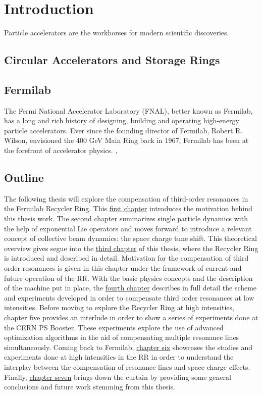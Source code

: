 \chapter{Introduction}
\label{sec:ch1}
 
Particle accelerators are the workhorses for modern scientific discoveries. 

\section{Circular Accelerators and Storage Rings}

\section{Fermilab}

The Fermi National Accelerator Laboratory (FNAL), better known as Fermilab, has a long and rich history of designing, building and operating high-energy particle accelerators. Ever since the founding director of Fermilab, Robert R. Wilson, envisioned the 400 GeV Main Ring back in 1967, Fermilab has been at the forefront of accelerator physics.     \cite{tevatron},\cite{fermilab1}

\section{Outline}

The following thesis will explore the compensation of third-order resonances in the Fermilab Recycler Ring. This \hyperref[sec:ch1]{first chapter} introduces the motivation behind this thesis work. The \hyperref[sec:ch2]{second chapter} summarizes single particle dynamics with the help of exponential Lie operators and moves forward to introduce a relevant concept of collective beam dynamics: the space charge tune shift. This theoretical overview gives segue into the \hyperref[sec:ch3]{third chapter} of this thesis, where the Recycler Ring is introduced and described in detail. Motivation for the compensation of third order resonances is given in this chapter under the framework of current and future operation of the RR. With the basic physics concepts and the description of the machine put in place, the \hyperref[sec:ch4]{fourth chapter} describes in full detail the scheme and experiments developed in order to compensate third order resonances at low intensities. Before moving to explore the Recycler Ring at high intensities, \hyperref[sec:ch5]{chapter five} provides an interlude in order to show a series of experiments done at the CERN PS Booster. These experiments explore the use of advanced optimization algorithms in the aid of compensating multiple resonance lines simultaneously. Coming back to Fermilab, \hyperref[sec:ch6]{chapter six} showcases the studies and experiments done at high intensities in the RR in order to understand the interplay between the compensation of resonance lines and space charge effects. Finally, \hyperref[sec:ch7]{chapter seven} brings down the curtain by providing some general conclusions and future work stemming from this thesis.